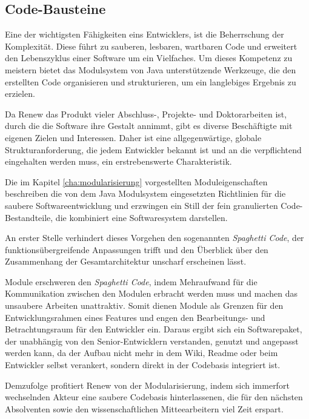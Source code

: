 \subsection{Code-Bausteine}\label{sub:cbs}
Eine der wichtigsten Fähigkeiten eins Entwicklers, ist die Beherrschung der Komplexität. Diese führt zu sauberen, lesbaren, wartbaren Code und erweitert den Lebenszyklus einer Software um ein Vielfaches. Um dieses Kompetenz zu meistern bietet das Modulsystem von Java unterstützende Werkzeuge, die den erstellten Code organisieren und strukturieren, um ein langlebiges Ergebnis zu erzielen.  \newline

Da Renew das Produkt vieler Abschluss-, Projekte- und Doktorarbeiten ist, durch die die Software ihre Gestalt annimmt, gibt es diverse Beschäftigte mit eigenen Zielen und Interessen. Daher ist eine allgegenwärtige, globale Strukturanforderung, die jedem Entwickler bekannt ist und an die verpflichtend eingehalten werden muss, ein erstrebenswerte Charakteristik.  \newline

Die im Kapitel \ref{cha:modularisierung} vorgestellten Moduleigenschaften beschreiben die von dem Java Modulsystem eingesetzten Richtlinien für die saubere Softwareentwicklung und erzwingen ein Still der fein granulierten Code-Bestandteile, die kombiniert eine Softwaresystem darstellen. \newline

An erster Stelle verhindert dieses Vorgehen den sogenannten \textit{Spaghetti Code}, der funktionsübergreifende Anpassungen trifft und den Überblick über den Zusammenhang der Gesamtarchitektur unscharf erscheinen lässt.  \newline

Module erschweren den \textit{Spaghetti Code}, indem Mehraufwand für die Kommunikation zwischen den Modulen erbracht werden muss und machen das unsaubere Arbeiten unattraktiv. Somit dienen Module als Grenzen für den Entwicklungsrahmen eines Features und engen den Bearbeitungs- und Betrachtungsraum für den Entwickler ein. Daraus ergibt sich ein Softwarepaket, der unabhängig von den Senior-Entwicklern verstanden, genutzt und angepasst werden kann, da der Aufbau nicht mehr in dem Wiki, Readme oder beim Entwickler selbst verankert, sondern direkt in der Codebasis integriert ist.  \newline

Demzufolge profitiert Renew von der Modularisierung, indem sich immerfort wechselnden Akteur eine saubere Codebasis hinterlassenen, die für den nächsten Absolventen sowie den wissenschaftlichen Mitteearbeitern viel Zeit erspart. \bigbreak

